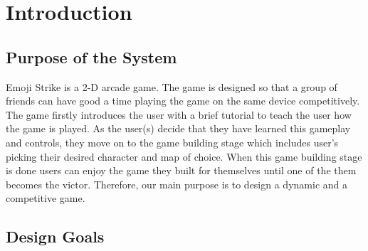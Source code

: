 \documentclass[12pt]{article} %
\begin{document}

\tableofcontents %

\newpage %


\section{Introduction} %


\subsection{Purpose of the System} %


Emoji Strike is a 2-D arcade game. The game is designed so that a group of friends can have good a time playing the game on the same device competitively. The game firstly introduces the user with a brief tutorial to teach the user how the game is played. As the user(s) decide that they have learned this gameplay and controls, they move on to the game building stage which includes user’s picking their desired character and map of choice. When this game building stage is done users can enjoy the game they built for themselves until one of the them becomes the victor. Therefore, our main purpose is to design a dynamic and a competitive game.



\subsection{Design Goals } %








\end{document}
